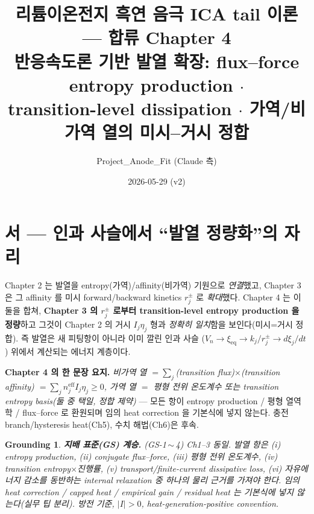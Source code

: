 \documentclass[11pt,a4paper]{article}
\title{\textbf{리튬이온전지 흑연 음극 ICA tail 이론 — 합류 Chapter 4}\\[0.4em]
\large 반응속도론 기반 발열 확장: flux--force entropy production $\cdot$\\
transition-level dissipation $\cdot$ 가역/비가역 열의 미시--거시 정합}
\author{Project\_Anode\_Fit (Claude 측)}
\date{2026-05-29 (v2)}
\newtheorem*{groundingbox}{Grounding}
\newcommand{\eff}{\mathrm{eff}}
\newcommand{\eq}{\mathrm{eq}}
\begin{document}
\maketitle

\section*{서 — 인과 사슬에서 ``발열 정량화''의 자리}
Chapter 2 는 발열을 entropy(가역)/affinity(비가역) 기원으로 \emph{연결}했고, Chapter 3 은 그 affinity 를
미시 forward/backward kinetics $r_j^\pm$ 로 \emph{확대}했다. Chapter 4 는 이 둘을 합쳐, \textbf{Chapter 3 의
$r_j^\pm$ 로부터 transition-level entropy production 을 정량}하고 그것이 Chapter 2 의 거시 $I_j\eta_j$ 형과
\emph{정확히 일치}함을 보인다(미시=거시 정합). 즉 발열은 새 피팅항이 아니라 이미 깔린 인과 사슬
($V_n\to\xi_{\eq}\to k_j/r_j^\pm\to d\xi_j/dt$) 위에서 계산되는 에너지 계층이다.

\textbf{Chapter 4 의 한 문장 요지.} \emph{비가역 열 $=\sum_j$(transition flux)$\times$(transition affinity)
$=\sum_j n_j^{\eff}I_j\eta_j\ge0$, 가역 열 $=$ 평형 전위 온도계수 또는 transition entropy basis(둘 중 택일,
정합 제약)} — 모든 항이 entropy production / 평형 열역학 / flux--force 로 환원되며 임의 heat correction 을
기본식에 넣지 않는다. 충전 branch/hysteresis heat(Ch5), 수치 해법(Ch6)은 후속.

\begin{groundingbox}
\textbf{지배 표준(GS) 계승.} (GS-1\,$\sim$\,4) Ch1--3 동일. 발열 항은 (i) entropy production, (ii) conjugate
flux--force, (iii) 평형 전위 온도계수, (iv) transition entropy$\times$진행률, (v) transport/finite-current
dissipative loss, (vi) 자유에너지 감소를 동반하는 internal relaxation 중 하나의 물리 근거를 가져야 한다.
임의 heat correction / capped heat / empirical gain / residual heat 는 기본식에 넣지 않는다(실무 팁 분리).
방전 기준, $|I|>0$, heat-generation-positive convention.
\end{groundingbox}

\tableofcontents
\newpage

\end{document}
